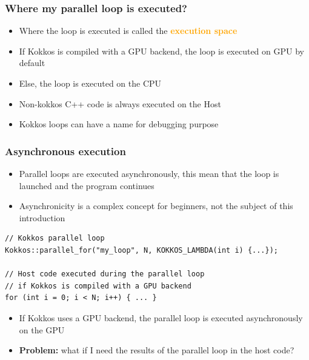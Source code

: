 \documentclass[aspectratio=169]{beamer}
\begin{document}

\begin{frame}[fragile]
    \frametitle{Where my parallel loop is executed?} 

\begin{itemize}
    \item Where the loop is executed is called the \textcolor{orange}{\textbf{execution space}}
    \item If Kokkos is compiled with a GPU backend, the loop is executed on GPU by default
    \item Else, the loop is executed on the CPU
    \item Non-kokkos C++ code is always executed on the Host
    \item Kokkos loops can have a name for debugging purpose
\end{itemize}

\end{frame}


\begin{frame}[fragile]
    \frametitle{Asynchronous execution} 

\begin{itemize}
    \item Parallel loops are executed asynchronously, this mean that the loop is launched and the program continues
    \item Asynchronicity is a complex concept for beginners, not the subject of this introduction
\end{itemize}

\small
\begin{verbatim}
// Kokkos parallel loop
Kokkos::parallel_for("my_loop", N, KOKKOS_LAMBDA(int i) {...});

// Host code executed during the parallel loop 
// if Kokkos is compiled with a GPU backend
for (int i = 0; i < N; i++) { ... }
\end{verbatim}

\normalsize


\begin{itemize}
    \item If Kokkos uses a GPU backend, the parallel loop is executed asynchronously on the GPU
    \item \textbf{Problem:} what if I need the results of the parallel loop in the host code?
\end{itemize}

\end{frame}
\end{document}
